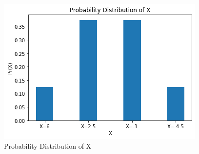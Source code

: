 \documentclass[journal,12pt,twocolumn]{IEEEtran}
\begin{document}
\begin{figure}[!ht]
\centering
\includegraphics[width=\columnwidth]{Figure14}
\caption{Probability Distribution of X}
\label{fig:fig1}	
\end{figure}
\end{document}
